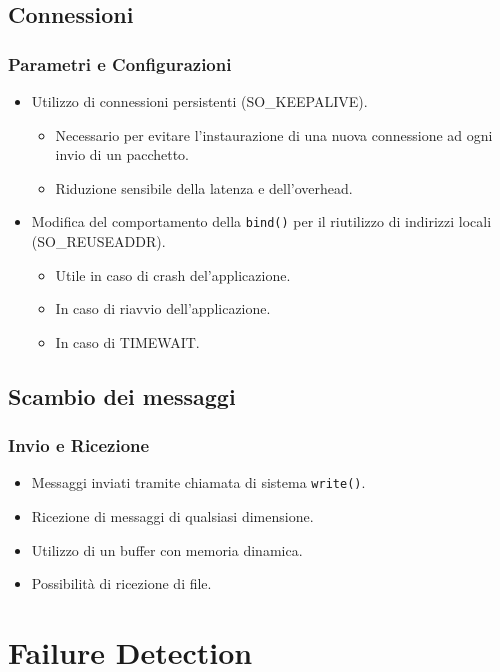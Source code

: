 \documentclass[a4paper,italian,12pt]{beamer}
\begin{document}
		\subsection{Connessioni}
			\begin{frame}
				\frametitle{Parametri e Configurazioni}
				\begin{itemize}
					\item Utilizzo di connessioni persistenti (SO\_KEEPALIVE).
						\begin{itemize}
							\vspace{2mm}
							\item Necessario per evitare l'instaurazione di una nuova connessione ad ogni invio di un pacchetto.
							\item Riduzione sensibile della latenza e dell'overhead.							 
						\end{itemize}
					\vspace{5mm}	
					\item Modifica del comportamento della \texttt{bind()} per il riutilizzo di indirizzi locali (SO\_REUSEADDR).
						\begin{itemize}
							\vspace{2mm}
							\item Utile in caso di crash del'applicazione.
							\item In caso di riavvio dell'applicazione.
							\item In caso di TIMEWAIT.
						\end{itemize}
				\end{itemize}
			\end{frame}	
		\subsection{Scambio dei messaggi}
			\begin{frame}
				\frametitle{Invio e Ricezione}
					\begin{itemize}
						\item Messaggi inviati tramite chiamata di sistema \texttt{write()}.
						\vspace{5mm}
						\item Ricezione di messaggi di qualsiasi dimensione. 
						\item Utilizzo di un buffer con memoria dinamica.
						\item Possibilità di ricezione di file.
					\end{itemize}	
			\end{frame}
	\section{Failure Detection}
\end{document}
